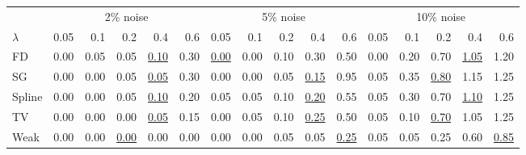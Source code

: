 \begin{tabular}{l|rrrrr|rrrrr|rrrrr}\toprule
 & \multicolumn{5}{c}{2\% noise} & \multicolumn{5}{c}{5\% noise} & \multicolumn{5}{c}{10\% noise} \\
$\lambda$ & 0.05 & 0.1 & 0.2 & 0.4 & 0.6 & 0.05 & 0.1 & 0.2 & 0.4 & 0.6 & 0.05 & 0.1 & 0.2 & 0.4 & 0.6 \\\midrule
FD & 0.00 & 0.05 & 0.05 & \colorbox{black!15}{\underline{0.10}} & 0.30 & \underline{0.00} & \colorbox{black!15}{0.00} & 0.10 & 0.30 & 0.50 & 0.00 & 0.20 & 0.70 & \underline{1.05} & \colorbox{black!15}{1.20} \\
SG & 0.00 & 0.00 & 0.05 & \colorbox{black!15}{\underline{0.05}} & 0.30 & 0.00 & 0.00 & 0.05 & \colorbox{black!15}{\underline{0.15}} & 0.95 & 0.05 & 0.35 & \colorbox{black!15}{\underline{0.80}} & 1.15 & 1.25 \\
Spline & 0.00 & 0.00 & 0.05 & \colorbox{black!15}{\underline{0.10}} & 0.20 & 0.05 & 0.05 & 0.10 & \colorbox{black!15}{\underline{0.20}} & 0.55 & 0.05 & 0.30 & 0.70 & \underline{1.10} & \colorbox{black!15}{1.25} \\
TV & 0.00 & 0.00 & 0.00 & \colorbox{black!15}{\underline{0.05}} & 0.15 & 0.00 & 0.05 & 0.10 & \colorbox{black!15}{\underline{0.25}} & 0.50 & 0.05 & 0.10 & \colorbox{black!15}{\underline{0.70}} & 1.05 & 1.25 \\
Weak & 0.00 & 0.00 & \underline{0.00} & 0.00 & \colorbox{black!15}{0.00} & 0.00 & 0.00 & 0.05 & 0.05 & \colorbox{black!15}{\underline{0.25}} & 0.05 & 0.05 & 0.25 & 0.60 & \colorbox{black!15}{\underline{0.85}} \\
\bottomrule\end{tabular}
